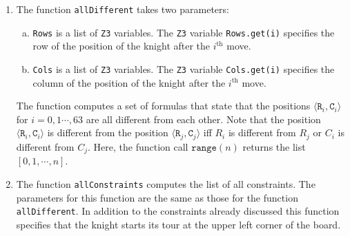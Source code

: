 \begin{enumerate}
      In line 20 we use the fact that the method \texttt{Z3.mkOr} can take any number of arguments.  In
      \textsl{Java}, such a method can also be called with an array containing these arguments.  The method call
      \texttt{formulas.toArray(BoolExpr[]::new)} converts the list \texttt{formulas} into an array.  If
      \texttt{formulas} is the list
      \\[0.2cm]
      \hspace*{1.3cm}
      $\texttt{formulas} = [f_1, \cdots, f_n]$,
      \\[0.2cm]
      then the method call in line 20 computes the logical disjunction
      \\[0.2cm]
      \hspace*{1.3cm}
      $f_1 \vee \cdots \vee f_n$.
\item The function \texttt{allDifferent} takes two parameters:
      \begin{enumerate}[(a)]
      \item \texttt{Rows} is a list of \texttt{Z3} variables. The \texttt{Z3} variable \texttt{Rows.get(i)}
            specifies the row of the position of the knight after the $i^{\textrm{th}}$ move. 
      \item \texttt{Cols} is a list of \texttt{Z3} variables. The \texttt{Z3} variable \texttt{Cols.get(i)}
            specifies the column of the position of the knight after the $i^{\textrm{th}}$ move. 
      \end{enumerate}
      The function computes a set of formulas that state that the positions
      $\langle \mathtt{R}_i, \mathtt{C}_i \rangle$ for $i=0,1\cdots, 63$ are all different from each other.
      Note that the position $\langle \mathtt{R}_i, \mathtt{C}_i \rangle$ is different from the position
      $\langle \mathtt{R}_j, \mathtt{C}_j \rangle$ iff $R_i$ is different from $R_j$ or $C_i$ is different from
      $C_j$.  Here, the function call $\texttt{range}(n)$ returns the list $[0, 1, \cdots, n]$.
\item The function \texttt{allConstraints} computes the list of all constraints.
      The parameters for this function are the same as those for the function \texttt{allDifferent}.
      In addition to the constraints already discussed this function specifies that the knight starts
      its tour at the upper left corner of the board.


\end{enumerate}
